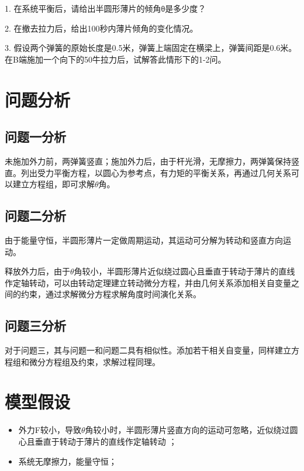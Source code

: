 \documentclass[withoutpreface,bwprint]{cumcmthesis} %
\begin{document}
	1.	在系统平衡后，请给出半圆形薄片的倾角θ是多少度？
	
	2.	在撤去拉力后，给出100秒内薄片倾角的变化情况。
	
	3.	假设两个弹簧的原始长度是0.5米，弹簧上端固定在横梁上，弹簧间距是0.6米。在B端施加一个向下的50牛拉力后，试解答此情形下的1-2问。
	
	
	\section{问题分析}
	\subsection{问题一分析}
	未施加外力前，两弹簧竖直；施加外力后，由于杆光滑，无摩擦力，两弹簧保持竖直。列出受力平衡方程，以圆心为参考点，有力矩的平衡关系，再通过几何关系可以建立方程组，即可求解$\theta$角。
	
	\subsection{问题二分析}
	由于能量守恒，半圆形薄片一定做周期运动，其运动可分解为转动和竖直方向运动。
	
	释放外力后，由于$\theta$角较小，半圆形薄片近似绕过圆心且垂直于转动于薄片的直线作定轴转动，可以由转动定理建立转动微分方程，并由几何关系添加相关自变量之间的约束，通过求解微分方程求解角度时间演化关系。
	
	\subsection{问题三分析}
	对于问题三，其与问题一和问题二具有相似性。添加若干相关自变量，同样建立方程组和微分方程组及约束，求解过程同理。
	
	\section{模型假设}
	\begin{itemize}
		\item 外力F较小，导致$\theta$角较小时，半圆形薄片竖直方向的运动可忽略，近似绕过圆心且垂直于转动于薄片的直线作定轴转动	；
		\item  系统无摩擦力，能量守恒；	
	\end{itemize}
	
\end{document}
